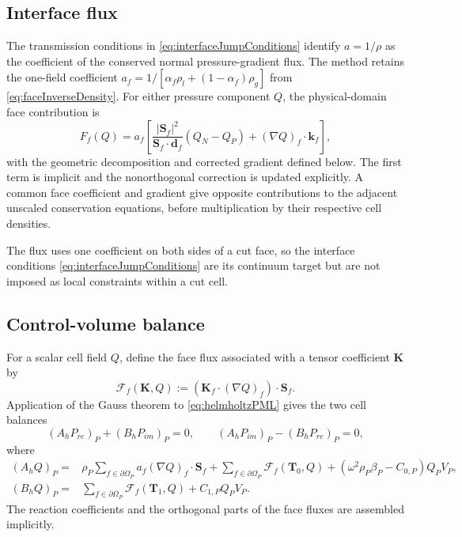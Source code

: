 \documentclass[final,12pt,nopreprintline,longtitle]{elsarticle}
\newcommand{\Sf}{\mathbf{S}_f}
\newcommand{\betaac}{\beta}
\begin{document}
\subsection{Interface flux}

The transmission conditions in \cref{eq:interfaceJumpConditions} identify
$a=1/\rho$ as the coefficient of the conserved normal pressure-gradient flux.
The method retains the one-field coefficient
$a_f=1/[\alpha_f\rho_l+(1-\alpha_f)\rho_g]$ from
\cref{eq:faceInverseDensity}.  For either pressure component $Q$, the
physical-domain face contribution is
\begin{equation}
    F_f(Q)=a_f\left[
        \frac{|\Sf|^2}{\Sf\cdot\mathbf d_f}(Q_N-Q_P)
        +(\nabla Q)_f\cdot\mathbf k_f
    \right],
    \label{eq:retainedInterfaceFlux}
\end{equation}
with the geometric decomposition and corrected gradient defined below.
The first term is implicit and the nonorthogonal correction is updated
explicitly.  A common face coefficient and gradient give opposite
contributions to the adjacent unscaled conservation equations, before
multiplication by their respective cell densities.

The flux uses one coefficient on both sides of a cut face, so the interface
conditions \cref{eq:interfaceJumpConditions} are its continuum target but are
not imposed as local constraints within a cut cell.

\subsection{Control-volume balance}

For a scalar cell field $Q$, define the face flux associated with a tensor
coefficient $\mathbf{K}$ by
\begin{equation}
    \mathcal{F}_f(\mathbf{K},Q)
    :=\left(\mathbf{K}_f\cdot(\nabla Q)_f\right)\cdot\Sf.
    \label{eq:genericFaceFlux}
\end{equation}
Application of the Gauss theorem to \cref{eq:helmholtzPML} gives the two
cell balances
\begin{equation}
    (A_hP_{re})_P+(B_hP_{im})_P=0,
    \qquad
    (A_hP_{im})_P-(B_hP_{re})_P=0,
    \label{eq:discreteCellBalances}
\end{equation}
where
\begin{equation}
\begin{aligned}
    (A_hQ)_P={}&
        \rho_P\sum_{f\in\partial\Omega_P}
        a_f(\nabla Q)_f\cdot\Sf
        +\sum_{f\in\partial\Omega_P}
        \mathcal{F}_f(\mathbf{T}_0,Q)
        +(\omega^2\rho_P\betaac_P-C_{0,P})Q_PV_P,\\
    (B_hQ)_P={}&
        \sum_{f\in\partial\Omega_P}
        \mathcal{F}_f(\mathbf{T}_1,Q)
        +C_{1,P}Q_PV_P.
\end{aligned}
\label{eq:discreteOperators}
\end{equation}
The reaction coefficients and the orthogonal parts of the face fluxes are
assembled implicitly.
\end{document}
